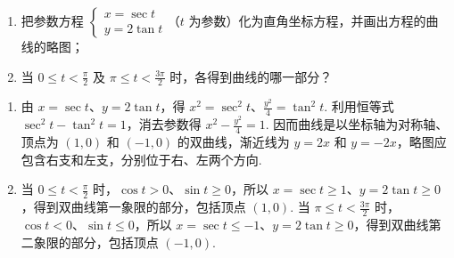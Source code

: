 \documentclass[UTF8,a4paper,oneside,11pt]{ctexbook}
\begin{document}
\begin{problem}
\begin{enumerate}
\item 把参数方程 \(\begin{cases}
x=\sec t\\
y=2\tan t
\end{cases}\)（\(t\) 为参数）化为直角坐标方程，并画出方程的曲线的略图；
\item 当 \(0\leqslant t<\frac{\pi}{2}\) 及 \(\pi\leqslant t<\frac{3\pi}{2}\) 时，各得到曲线的哪一部分？
\end{enumerate}
\end{problem}

\begin{solution}
\begin{enumerate}
\item 由 \(x=\sec t\)、\(y=2\tan t\)，得 \(x^2=\sec^2 t\)、\(\frac{y^2}{4}=\tan^2 t\). 利用恒等式 \(\sec^2 t-\tan^2 t=1\)，消去参数得 \(x^2-\frac{y^2}{4}=1\). 因而曲线是以坐标轴为对称轴、顶点为 \((1,0)\) 和 \((-1,0)\) 的双曲线，渐近线为 \(y=2x\) 和 \(y=-2x\)，略图应包含右支和左支，分别位于右、左两个方向.
\item 当 \(0\leqslant t<\frac{\pi}{2}\) 时，\(\cos t>0\)、\(\sin t\geqslant0\)，所以 \(x=\sec t\geqslant1\)、\(y=2\tan t\geqslant0\)，得到双曲线第一象限的部分，包括顶点 \((1,0)\). 当 \(\pi\leqslant t<\frac{3\pi}{2}\) 时，\(\cos t<0\)、\(\sin t\leqslant0\)，所以 \(x=\sec t\leqslant-1\)、\(y=2\tan t\geqslant0\)，得到双曲线第二象限的部分，包括顶点 \((-1,0)\).
\end{enumerate}
\end{solution}

\end{document}
